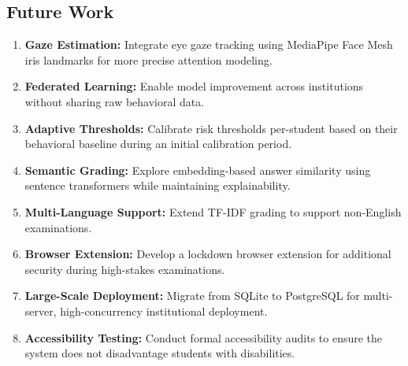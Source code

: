 \documentclass{article}
\begin{document}
\subsection{Future Work}

\begin{enumerate}
    \item \textbf{Gaze Estimation:} Integrate eye gaze tracking using MediaPipe Face Mesh iris landmarks for more precise attention modeling.
    \item \textbf{Federated Learning:} Enable model improvement across institutions without sharing raw behavioral data.
    \item \textbf{Adaptive Thresholds:} Calibrate risk thresholds per-student based on their behavioral baseline during an initial calibration period.
    \item \textbf{Semantic Grading:} Explore embedding-based answer similarity using sentence transformers while maintaining explainability.
    \item \textbf{Multi-Language Support:} Extend TF-IDF grading to support non-English examinations.
    \item \textbf{Browser Extension:} Develop a lockdown browser extension for additional security during high-stakes examinations.
    \item \textbf{Large-Scale Deployment:} Migrate from SQLite to PostgreSQL for multi-server, high-concurrency institutional deployment.
    \item \textbf{Accessibility Testing:} Conduct formal accessibility audits to ensure the system does not disadvantage students with disabilities.
\end{enumerate}

\newpage
{}
\end{document}
